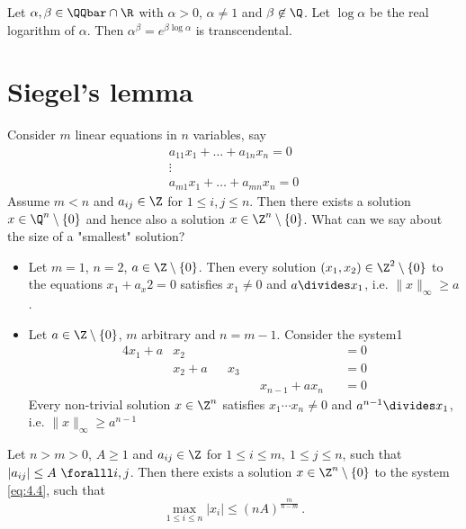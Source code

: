 \begin{thmn}
	Let \( \alpha, \beta \in \QQbar \cap \R \) with \( \alpha > 0 \), \( \alpha \neq 1 \) and \( \beta \not\in \Q \).
	Let \( \log\alpha \) be the real logarithm of \( \alpha \).
	Then \( \alpha^\beta = e^{\beta \log\alpha} \) is transcendental.
\end{thmn}


\section{Siegel's lemma}

Consider \( m \) linear equations in \( n \) variables, say
\begin{equation}\label{eq:4.4}
	\begin{array}{c}
		a_{11} x_1 + \dots + a_{1n}x_n = 0\\
		\vdots \\
		a_{m1}x_1 + \dots + a_{mn}x_n = 0
	\end{array}
\end{equation}
Assume \( m < n \) and \( a_{ij} \in \Z \) for \( 1 \leq i,j \leq n \).
Then there exists a solution \( x \in \Q^n \setminus \{0\} \) and hence also a solution \( x \in \Z^n \setminus \{0\} \).
What can we say about the size of a "smallest" solution?

\begin{exmp*}
	\begin{itemize}
		\item Let \( m=1 \), \( n=2 \), \( a \in \Z \setminus \{0\} \).
			Then every solution \( (x_1,x_2) \in \Z^2 \setminus \{0\} \) to  the equations \( x_1 + a_x2 = 0 \) satisfies \( x_1 \neq 0 \) and \( a \divides x_1 \), i.e. \( \|x\|_\infty \geq a \).
		\item Let \( a \in \Z \setminus \{0\} \), \( m \) arbitrary and \( n = m-1 \).
			Consider the system1
			\begin{alignat*}{4}
				x_1 + a &x_2 && && &&= 0\\
				&x_2 + a &&x_3 && &&= 0\\
				& && &&x_{n-1} + ax_n &&= 0
			\end{alignat*}
			Every non-trivial solution \( x \in \Z^n \) satisfies \( x_1 \dotsm x_n \neq 0 \) and \( a^{n-1} \divides x_1 \), i.e. \( \|x\|_\infty \geq a^{n-1} \)
	\end{itemize}
\end{exmp*}

\begin{thm}\label{thm:4.34} 
	Let \( n > m > 0 \), \( A \geq 1 \) and \( a_{ij} \in \Z \) for \( 1 \leq i \leq m,\ 1 \leq j \leq n \), such that \( |a_{ij}| \leq A \ \foralll i,j \).
	Then there exists a solution \( x \in \Z^n \setminus \{0\} \) to the system \eqref{eq:4.4}, such that
	\[ \max_{1 \leq i \leq n} |x_i| \leq (nA)^\frac{m}{n-m} \,. \]
\end{thm}

